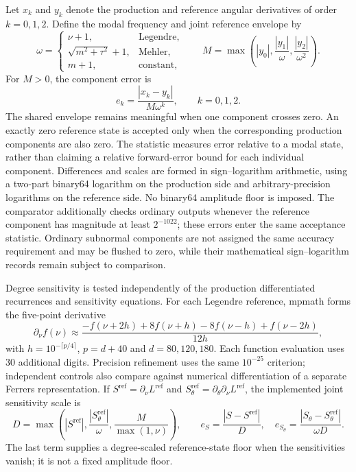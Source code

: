 ﻿\documentclass[11pt,a4paper]{article}
\newcommand{\abs}[1]{\left|#1\right|}
\begin{document}
Let $x_k$ and $y_k$ denote the production and reference angular derivatives of order $k=0,1,2$. Define the modal frequency and joint reference envelope by
\begin{equation}
 \omega=\begin{cases}
 \nu+1,&\text{Legendre},\\
 \sqrt{m^2+\tau^2}+1,&\text{Mehler},\\
 m+1,&\text{constant},
 \end{cases}
 \qquad
 M=\max\!\left(\abs{y_0},\frac{\abs{y_1}}{\omega},
 \frac{\abs{y_2}}{\omega^2}\right).
 \label{eq:reference_scale}
\end{equation}
For $M>0$, the component error is
\begin{equation}
 e_k=\frac{\abs{x_k-y_k}}{M\omega^k},\qquad k=0,1,2.
 \label{eq:reference_scaled_error}
\end{equation}
The shared envelope remains meaningful when one component crosses zero. An exactly zero reference state is accepted only when the corresponding production components are also zero. The statistic measures error relative to a modal state, rather than claiming a relative forward-error bound for each individual component. Differences and scales are formed in sign--logarithm arithmetic, using a two-part binary64 logarithm on the production side and arbitrary-precision logarithms on the reference side. No binary64 amplitude floor is imposed. The comparator additionally checks ordinary outputs whenever the reference component has magnitude at least $2^{-1022}$; these errors enter the same acceptance statistic. Ordinary subnormal components are not assigned the same accuracy requirement and may be flushed to zero, while their mathematical sign--logarithm records remain subject to comparison.

Degree sensitivity is tested independently of the production differentiated recurrences and sensitivity equations. For each Legendre reference, mpmath forms the five-point derivative
\begin{equation}
 \partial_\nu f(\nu)\approx
 \frac{-f(\nu+2h)+8f(\nu+h)-8f(\nu-h)+f(\nu-2h)}{12h},
 \label{eq:degree_reference_difference}
\end{equation}
with $h=10^{-\lceil p/4\rceil}$, $p=d+40$ and $d=80,120,180$. Each function evaluation uses 30 additional digits. Precision refinement uses the same $10^{-25}$ criterion; independent controls also compare against numerical differentiation of a separate Ferrers representation. If $S^{\mathrm{ref}}=\partial_\nu L^{\mathrm{ref}}$ and $S_\theta^{\mathrm{ref}}=\partial_\theta\partial_\nu L^{\mathrm{ref}}$, the implemented joint sensitivity scale is
\begin{equation}
 D=\max\!\left(\abs{S^{\mathrm{ref}}},
 \frac{\abs{S_\theta^{\mathrm{ref}}}}{\omega},
 \frac{M}{\max(1,\nu)}\right),\qquad
 e_S=\frac{\abs{S-S^{\mathrm{ref}}}}{D},\quad
 e_{S_\theta}=\frac{\abs{S_\theta-S_\theta^{\mathrm{ref}}}}{\omega D}.
 \label{eq:sensitivity_reference_scale}
\end{equation}
The last term supplies a degree-scaled reference-state floor when the sensitivities vanish; it is not a fixed amplitude floor.
\end{document}
